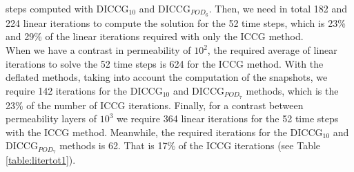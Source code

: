 \documentclass[review]{elsarticle}
\begin{document}
steps computed with DICCG$_{10}$ and DICCG$_{POD_6}$. Then, we need in total 182 and 224 linear iterations to compute the 
solution for the 52 time steps, which is 23\% and 29\% of the linear iterations required with only the ICCG method.\\
When we have a contrast in permeability of $10^{2}$, the required average of linear iterations to solve the 52 
time steps is 624 for the ICCG method. With the deflated methods, taking into account the computation of the snapshots, we require 
142 iterations for the DICCG$_{10}$ and  DICCG$_{POD_7}$ methods, which is the 23\% of the number of ICCG iterations. 
Finally, for a contrast between permeability layers of $10^{3}$ we require 364 linear iterations for the 52 time steps 
with the ICCG method. Meanwhile, the required iterations for the DICCG$_{10}$ and DICCG$_{POD_7}$ methods is 62. 
That is 17\% of the ICCG iterations (see Table \ref{table:litertot1}).\\
\end{document}
